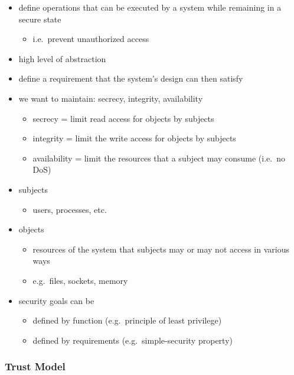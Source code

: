 \documentclass[
  12pt]{findlay}
\providecommand{\tightlist}{%
  \setlength{\itemsep}{0pt}\setlength{\parskip}{0pt}}
\begin{document}
\begin{itemize}
\tightlist
\item
  define operations that can be executed by a system while remaining in
  a secure state

  \begin{itemize}
  \tightlist
  \item
    i.e.~prevent unauthorized access
  \end{itemize}
\item
  high level of abstraction
\item
  define a requirement that the system's design can then satisfy
\item
  we want to maintain: secrecy, integrity, availability

  \begin{itemize}
  \tightlist
  \item
    secrecy = limit read access for objects by subjects
  \item
    integrity = limit the write access for objects by subjects
  \item
    availability = limit the resources that a subject may consume
    (i.e.~no DoS)
  \end{itemize}
\item
  subjects

  \begin{itemize}
  \tightlist
  \item
    users, processes, etc.
  \end{itemize}
\item
  objects

  \begin{itemize}
  \tightlist
  \item
    resources of the system that subjects may or may not access in
    various ways
  \item
    e.g.~files, sockets, memory
  \end{itemize}
\item
  security goals can be

  \begin{itemize}
  \tightlist
  \item
    defined by function (e.g.~principle of least privilege)
  \item
    defined by requirements (e.g.~simple-security property)
  \end{itemize}
\end{itemize}

\hypertarget{trust-model}{%
\subsubsection{Trust Model}\label{trust-model}}
\end{document}

